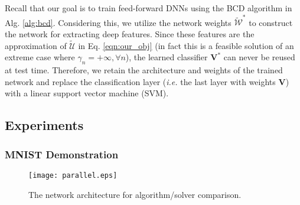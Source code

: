\documentclass{article}
\def\ie{\emph{i.e. }}
\begin{document}
    
    
Recall that our goal is to train feed-forward DNNs using the BCD algorithm in Alg. \ref{alg:bcd}. Considering this, we utilize the network weights $\tilde{\mathcal{W}}^*$ to construct the network for extracting deep features. Since these features are the approximation of $\tilde{\mathcal{U}}$ in Eq. \ref{eqn:our_obj} (in fact this is a feasible solution of an extreme case where $\gamma_n=+\infty, \forall n$), the learned classifier $\mathbf{V}^*$ can never be reused at test time. Therefore, we %
retain the architecture and weights of the trained network and replace the classification layer (\ie the last layer with weights $\mathbf{V}$) with a linear support vector machine (SVM).

 \subsection{Experiments}
 \subsubsection{MNIST Demonstration}

\begin{wrapfigure}{r}{0.35\linewidth} 
	\vspace{-18pt}
	\begin{center}
		\texttt{[image: parallel.eps]}\vspace{-3mm}
		\caption{\footnotesize The network architecture for algorithm/solver comparison.}
		\label{fig:structure}
	\end{center}
	\vspace{-20pt}
\end{wrapfigure}
\end{document}
